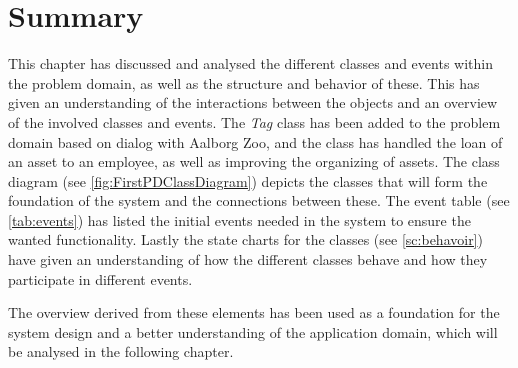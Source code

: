 \section{Summary} \label{ssc:pd_summary}
This chapter has discussed and analysed the different classes and events within the problem domain, as well as the structure and behavior of these. This has given an understanding of the interactions between the objects and an overview of the involved classes and events. The \textit{Tag} class has been added to the problem domain based on dialog with Aalborg Zoo, and the class has handled the loan of an asset to an employee, as well as improving the organizing of assets. The class diagram (see \autoref{fig:FirstPDClassDiagram}) depicts the classes that will form the foundation of the system and the connections between these. The event table (see \autoref{tab:events}) has listed the initial events needed in the system to ensure the wanted functionality. Lastly the state charts for the classes (see \autoref{sc:behavoir}) have given an understanding of how the different classes behave and how they participate in different events.
\par
The overview derived from these elements has been used as a foundation for the system design and a better understanding of the application domain, which will be analysed in the following chapter.\\